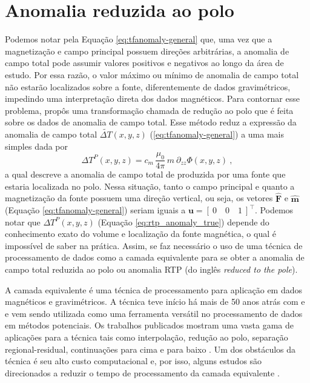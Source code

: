 \section{Anomalia reduzida ao polo}

Podemos notar pela Equação \ref{eq:tfanomaly-general} que, uma vez que a magnetização e campo principal possuem direções arbitrárias, a anomalia de campo total pode assumir valores positivos e negativos ao longo da área de estudo. Por essa razão, o valor máximo ou mínimo de anomalia de campo total não estarão localizados sobre a fonte, diferentemente de dados gravimétricos, impedindo uma interpretação direta dos dados magnéticos. 
Para contornar esse problema, \citet{baranov1957} propôs uma transformação chamada de redução ao polo que é feita sobre os dados de anomalia de campo total.
Esse método reduz a expressão da anomalia de campo total $\tilde{\Delta T}(x, y, z)$ (\ref{eq:tfanomaly-general}) a uma mais simples dada por
\begin{equation}
\Delta T^{P}(x, y, z) = c_{m} \, \frac{\mu_{0}}{4\pi} \, m \: \partial_{zz} \Phi(x, y, z) \: ,
\label{eq:rtp_anomaly_true}
\end{equation}
a qual descreve a anomalia de campo total de produzida por uma fonte que estaria localizada no polo. Nessa situação, tanto o campo principal e quanto a magnetização da fonte possuem uma direção vertical, ou seja, os vetores $\hat{\mathbf{F}}$ e 
$\hat{\mathbf{m}}$ (Equação \ref{eq:tfanomaly-general}) 
seriam iguais a $\mathbf{u} = \left[\:0 \quad 0 \quad 1 \: \right]^{\top}$.
Podemos notar que  $\Delta T^{P}(x, y, z)$ (Equação \ref{eq:rtp_anomaly_true}) depende do conhecimento exato do volume e localização da fonte magnética, o qual é impossível de saber na prática. Assim, se faz necessário o uso de uma técnica de processamento de dados como a camada equivalente para se obter a anomalia de campo total reduzida ao polo ou anomalia RTP (do inglês \textit{reduced to the pole}).

A camada equivalente é uma técnica de processamento para aplicação em dados magnéticos e gravimétricos. A técnica teve início há mais de 50 anos atrás com \cite{dampney_equivalent_1969} e \cite{emilia_equivalent_1973} e vem sendo utilizada como uma ferramenta versátil no processamento de dados em métodos potenciais. Os trabalhos publicados mostram uma vasta gama de aplicações para a técnica tais como interpolação, redução ao polo, separação regional-residual, continuações para cima e para baixo \citep{mendonca1992,mendonca-silva1995,mendonca2004,macLennan-li2013,silva1986,li-li2014,hansen-miyazaki1984}. Um dos obstáculos da técnica é seu alto custo computacional e, por isso, alguns estudos são direcionados a reduzir o tempo de processamento da camada equivalente \citep{leao-silva1989,mendonca-silva1994,siqueira-etal2017,oliveirajr-etal2013, takahashi-2020,mendonca-2020}.

